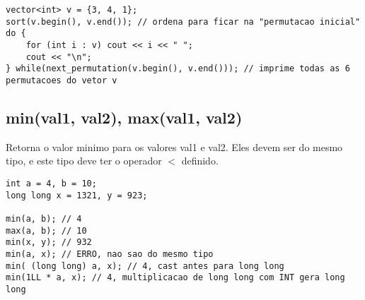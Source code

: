 \begin{lstlisting}
vector<int> v = {3, 4, 1};
sort(v.begin(), v.end()); // ordena para ficar na "permutacao inicial"
do {
	for (int i : v) cout << i << " ";
	cout << "\n";
} while(next_permutation(v.begin(), v.end())); // imprime todas as 6 permutacoes do vetor v
\end{lstlisting}

\subsection{min(val1, val2), max(val1, val2)}

Retorna o valor minimo para os valores val1 e val2. Eles devem ser do mesmo tipo, e este tipo deve ter o operador $<$ definido.

\begin{lstlisting}
int a = 4, b = 10;
long long x = 1321, y = 923;

min(a, b); // 4
max(a, b); // 10
min(x, y); // 932
min(a, x); // ERRO, nao sao do mesmo tipo
min( (long long) a, x); // 4, cast antes para long long
min(1LL * a, x); // 4, multiplicacao de long long com INT gera long long
\end{lstlisting}
